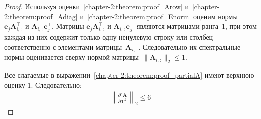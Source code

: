 \begin{proof}
Используя оценки~\eqref{chapter-2:theorem:proof_Arow} и~\eqref{chapter-2:theorem:proof_Adiag} и~\eqref{chapter-2:theorem:proof_Enorm} оценим нормы $\mathbf{e}_j \mathbf{A}_{i,:}^{\top}$ и $\mathbf{A}_{i,:}\mathbf{e}_j^{\top}.$
Матрицы $\mathbf{e}_j \mathbf{A}_{i,:}^{\top}$ и $\mathbf{A}_{i,:}\mathbf{e}_j^{\top}$ являются матрицами ранга~$1$, при этом каждая из них содержит только одну ненулевую строку или столбец соответственно с элементами матрицы~$\mathbf{A}_{i,:}$.
Следовательно их спектральные нормы оценивается сверху нормой матрицы~$\|\mathbf{A}_{i,:}\|_2 \leq 1$.

Все слагаемые в выражении~\eqref{chapter-2:theorem:proof_partialA} имеют верхнюю оценку $1$. Следовательно:
\begin{align}
    \left\| \frac{\partial^2 \mathbf{A}}{\partial \mathbf{T}^2} \right\|_2 \leq 6 
\end{align}


\end{proof}
